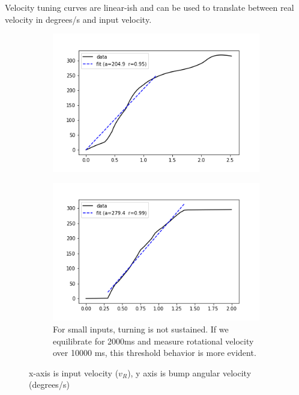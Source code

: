 \documentclass{article}
\begin{document}
Velocity tuning curves are linear-ish and can be used to translate between real velocity in degrees/s and input velocity.
\begin{figure}[h]
	\centering
	\begin{subfigure}[t]{0.43\linewidth}
		\centering
		\includegraphics[width = 1.0\linewidth, trim={30 20 30 20}, clip=true]{../figures/testvels_early.png}
		\label{fig:earlyrot}	
	\end{subfigure}
	\hspace{0.1\linewidth}
	\begin{subfigure}[t]{0.43\linewidth}
		\centering
		\includegraphics[width = 1.0\linewidth, trim={30 20 30 20}, clip=true]{../figures/testvels_late.png}
		\caption{For small inputs, turning is not sustained. If we equilibrate for 2000ms and measure rotational velocity over 10000 ms, this threshold behavior is more evident.}
		\label{fig:laterot}
	\end{subfigure}
\caption{ x-axis is input velocity ($v_R$), y axis is bump angular velocity (degrees/s)}
\label{fig:fit}
\end{figure}
\end{document}
